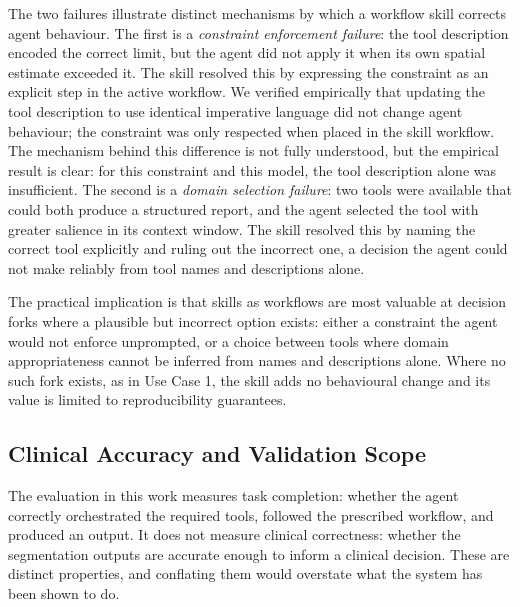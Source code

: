\documentclass[conference]{IEEEtran}
\begin{document}
The two failures illustrate distinct mechanisms by which a workflow skill corrects agent behaviour. The first is a \emph{constraint enforcement failure}: the tool description encoded the correct limit, but the agent did not apply it when its own spatial estimate exceeded it.
The skill resolved this by expressing the constraint as an explicit step in the active workflow. We verified empirically that updating the tool description to use identical imperative language did not change agent behaviour; the constraint was only respected when placed in the skill workflow. The mechanism behind this difference is not fully understood, but the empirical result is clear: for this constraint and this model, the tool description alone was insufficient. The second is a \emph{domain selection failure}: two tools were available that could both produce a structured report, and the agent selected the tool with greater salience in its context window. The skill resolved this by naming the correct tool explicitly and ruling out the incorrect one, a decision the agent could not make reliably from tool names and descriptions alone.

The practical implication is that skills as workflows are most valuable at decision forks where a plausible but incorrect option exists: either a constraint the agent would not enforce unprompted, or a choice between tools where domain appropriateness cannot be inferred from names and descriptions alone. Where no such fork exists, as in Use Case 1, the skill adds no behavioural change and its value is limited to reproducibility guarantees.

\subsection{Clinical Accuracy and Validation Scope}

The evaluation in this work measures task completion: whether the agent correctly orchestrated the required tools, followed the prescribed workflow, and produced an output. It does not measure clinical correctness: whether the segmentation outputs are accurate enough to inform a clinical decision. These are distinct properties, and conflating them would overstate what the system has been shown to do.
\end{document}

